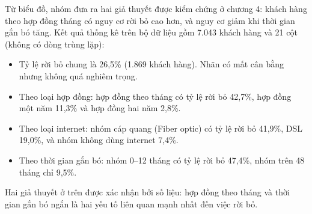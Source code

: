 Từ biểu đồ, nhóm đưa ra hai giả thuyết được kiểm chứng ở chương 4: khách hàng theo hợp đồng tháng có nguy cơ rời bỏ cao hơn,
và nguy cơ giảm khi thời gian gắn bó tăng. Kết quả thống kê trên bộ dữ liệu gồm 7.043 khách hàng và 21 cột (không có dòng trùng lặp):
\begin{itemize}
    \item Tỷ lệ rời bỏ chung là 26,5\% (1.869 khách hàng). Nhãn có mất cân bằng nhưng không quá nghiêm trọng.
    \item Theo loại hợp đồng: hợp đồng theo tháng có tỷ lệ rời bỏ 42,7\%, hợp đồng một năm 11,3\% và hợp đồng hai năm 2,8\%.
    \item Theo loại internet: nhóm cáp quang (Fiber optic) có tỷ lệ rời bỏ 41,9\%, DSL 19,0\%, và nhóm không dùng internet 7,4\%.
    \item Theo thời gian gắn bó: nhóm 0--12 tháng có tỷ lệ rời bỏ 47,4\%, nhóm trên 48 tháng chỉ 9,5\%.
\end{itemize}
Hai giả thuyết ở trên được xác nhận bởi số liệu: hợp đồng theo tháng và thời gian gắn bó ngắn là hai yếu tố liên quan mạnh nhất đến việc rời bỏ.
